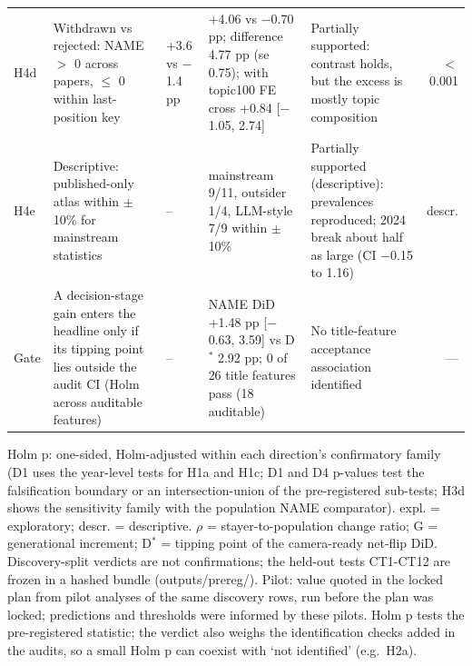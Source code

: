 {\begin{longtable}{l p{2.5cm} p{2.2cm} p{3.9cm} p{3.2cm} r}
H4d & Withdrawn vs rejected: NAME $>$ 0 across papers, $\leq$ 0 within last-position key & +3.6 vs $-$1.4 pp & +4.06 vs $-$0.70 pp; difference 4.77 pp (se 0.75); with topic100 FE cross +0.84 [$-$1.05, 2.74] & Partially supported: contrast holds, but the excess is mostly topic composition & $<$0.001 \\
H4e & Descriptive: published-only atlas within $\pm$10\% for mainstream statistics & -- & mainstream 9/11, outsider 1/4, LLM-style 7/9 within $\pm$10\% & Partially supported (descriptive): prevalences reproduced; 2024 break about half as large (CI $-$0.15 to 1.16) & descr. \\
Gate & A decision-stage gain enters the headline only if its tipping point lies outside the audit CI (Holm across auditable features) & -- & NAME DiD +1.48 pp [$-$0.63, 3.59] vs D$^{*}$ 2.92 pp; 0 of 26 title features pass (18 auditable) & No title-feature acceptance association identified & --- \\
\end{longtable}
\par\noindent \scriptsize Holm p: one-sided, Holm-adjusted within each direction's confirmatory family (D1 uses the year-level tests for H1a and H1c; D1 and D4 p-values test the falsification boundary or an intersection-union of the pre-registered sub-tests; H3d shows the sensitivity family with the population NAME comparator). expl. = exploratory; descr. = descriptive. $\rho$ = stayer-to-population change ratio; G = generational increment; D$^{*}$ = tipping point of the camera-ready net-flip DiD. Discovery-split verdicts are not confirmations; the held-out tests CT1-CT12 are frozen in a hashed bundle (outputs/prereg/). Pilot: value quoted in the locked plan from pilot analyses of the same discovery rows, run before the plan was locked; predictions and thresholds were informed by these pilots. Holm p tests the pre-registered statistic; the verdict also weighs the identification checks added in the audits, so a small Holm p can coexist with `not identified' (e.g.\ H2a).\par
}
